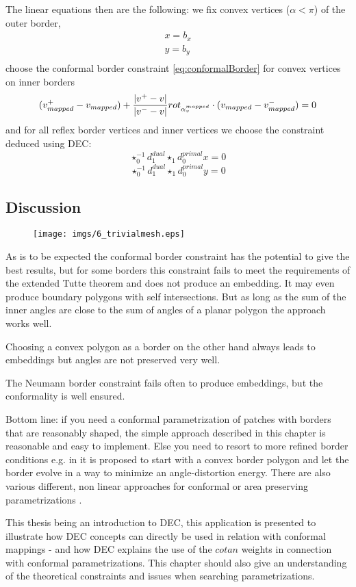 The linear equations then are the following: we fix convex vertices ($\alpha < \pi$) of the outer border,
\begin{eqnarray*}
 &x = b_x & \\
 &y = b_y &\\
\end{eqnarray*}
choose the conformal border constraint \ref{eq:conformalBorder} for convex vertices on inner borders 
\[(v^+_{mapped}-v_{mapped} ) + \frac{\left| v^+-v \right|}{\left| v^- -v \right|}rot_{\alpha_v^{mapped}} \cdot (v_{mapped} - v_{mapped}^- )= 0 \]
and for all reflex border vertices and inner vertices we choose the constraint deduced using DEC:
\[\star_0^{-1} d_1^{dual} \star_1 d_0^{primal} x = 0\]
\[\star_0^{-1} d_1^{dual} \star_1 d_0^{primal} y = 0\]


\subsection{Discussion}

\begin{figure}%
\texttt{[image: imgs/6\_trivialmesh.eps]}%
\caption{}%
\label{}%
\end{figure}
As is to be expected the conformal border constraint has the potential to give the best results, but for some borders this constraint fails to meet the requirements of the extended Tutte theorem and does not produce an embedding. It may even produce boundary polygons with self intersections. But as long as the sum of the inner angles are close to the sum of angles of a planar polygon the approach works well. 

Choosing a convex polygon as a border on the other hand always leads to embeddings but angles are not preserved very well. 

The Neumann border constraint fails often to produce embeddings, but the conformality is well ensured.

Bottom line: if you need a conformal parametrization of patches with borders that are reasonably shaped, the simple approach described in this chapter is reasonable and easy to implement. Else you need to resort to more refined border conditions e.g. in  it is proposed to start with a convex border polygon and let the border evolve in a way to minimize an angle-distortion energy. There are also various different, non linear approaches for conformal or area preserving parametrizations \note{[...]}.  

This thesis being an introduction to DEC, this application is presented to illustrate how DEC concepts can directly be used in relation with conformal mappings - and how DEC explains the use of the $cotan$ weights in connection with conformal parametrizations. This chapter should also give an understanding of the theoretical constraints and issues when searching parametrizations.

